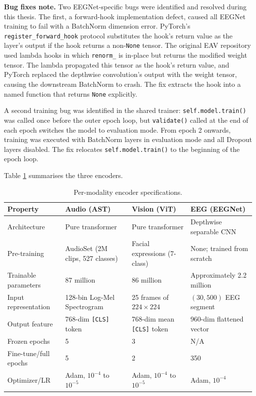 \textbf{Bug fixes note.} Two EEGNet-specific bugs were identified and resolved during this thesis. The first, a forward-hook implementation defect, caused all EEGNet training to fail with a BatchNorm dimension error. PyTorch's \texttt{register\_forward\_hook} protocol substitutes the hook's return value as the layer's output if the hook returns a non-\texttt{None} tensor. The original EAV repository used lambda hooks in which \texttt{renorm\_} is in-place but returns the modified weight tensor. The lambda propagated this tensor as the hook's return value, and PyTorch replaced the depthwise convolution's output with the weight tensor, causing the downstream BatchNorm to crash. The fix extracts the hook into a named function that returns \texttt{None} explicitly.

A second training bug was identified in the shared trainer: \texttt{self.model.train()} was called once before the outer epoch loop, but \texttt{validate()} called at the end of each epoch switches the model to evaluation mode. From epoch 2 onwards, training was executed with BatchNorm layers in evaluation mode and all Dropout layers disabled. The fix relocates \texttt{self.model.train()} to the beginning of the epoch loop.

Table \ref{tab:encoder_specs} summarises the three encoders.

\begin{table}[htbp]
\centering
\scriptsize
\caption{Per-modality encoder specifications.}
\label{tab:encoder_specs}
\begin{tabular}{p{2.6cm} p{3.5cm} p{3.5cm} p{3.4cm}}
\hline
\textbf{Property} & \textbf{Audio (AST)} & \textbf{Vision (ViT)} & \textbf{EEG (EEGNet)} \\
\hline
Architecture & Pure transformer & Pure transformer & Depthwise separable CNN \\
Pre-training & AudioSet (2M clips, 527 classes) & Facial expressions (7-class) & None; trained from scratch \\
Trainable parameters & 87 million & 86 million & Approximately 2.2 million \\
Input representation & 128-bin Log-Mel Spectrogram & 25 frames of $224\times224$ & $(30, 500)$ EEG segment \\
Output feature & 768-dim \texttt{[CLS]} token & 768-dim mean \texttt{[CLS]} token & 960-dim flattened vector \\
Frozen epochs & 5 & 3 & N/A \\
Fine-tune/full epochs & 5 & 2 & 350 \\
Optimizer/LR & Adam, $10^{-4}$ to $10^{-5}$ & Adam, $10^{-4}$ to $10^{-5}$ & Adam, $10^{-4}$ \\
\hline
\end{tabular}
\end{table}

